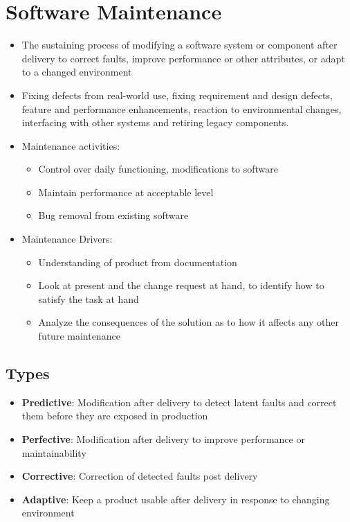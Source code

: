 \documentclass{article}
\begin{document}
\section{Software Maintenance}
\begin{itemize}
    \item The sustaining process of modifying a software system or component after delivery to correct faults, improve performance or other attributes, or adapt to a changed environment 
    
    \item Fixing defects from real-world use, fixing requirement and design defects, feature and performance enhancements, reaction to environmental changes, interfacing with other systems and retiring legacy components.
    
    \item Maintenance activities:
    \begin{itemize}
        \item Control over daily functioning, modifications to software
        
        \item Maintain performance at acceptable level
        
        \item Bug removal from existing software
    \end{itemize}
    
    \item Maintenance Drivers:
    \begin{itemize}
        \item Understanding of product from documentation
        
        \item Look at present and the change request at hand, to identify how to satisfy the task at hand
        
        \item Analyze the consequences of the solution as to how it affects any other future maintenance
    \end{itemize}
\end{itemize}
\subsection{Types}
\begin{itemize}
    \item \textbf{Predictive}: Modification after delivery to detect latent faults and correct them before they are exposed in production
    
    \item \textbf{Perfective}: Modification after delivery to improve performance or maintainability
    
    \item \textbf{Corrective}: Correction of detected faults post delivery
    
    \item \textbf{Adaptive}: Keep a product usable after delivery in response to changing environment

\end{itemize}
\end{document}
